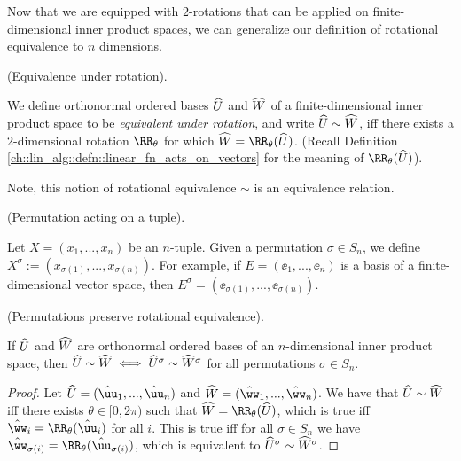 Now that we are equipped with $2$-rotations that can be applied on finite-dimensional inner product spaces, we can generalize our definition of rotational equivalence to $n$ dimensions.

\begin{defn}
    (Equivalence under rotation).
    
    We define orthonormal ordered bases $\widehat{U}$ and $\widehat{W}$ of a finite-dimensional inner product space to be \textit{equivalent under rotation}, and write $\widehat{U} \sim \widehat{W}$, iff there exists a $2$-dimensional rotation $\RR_\theta$ for which $\hW = \RR_\theta(\hU)$. (Recall Definition \ref{ch::lin_alg::defn::linear_fn_acts_on_vectors} for the meaning of $\RR_\theta(\hU)$).
    
    Note, this notion of rotational equivalence $\sim$ is an equivalence relation.
\end{defn}

\begin{defn}
    (Permutation acting on a tuple). 
    
    Let $X = (x_1, ..., x_n)$ be an $n$-tuple. Given a permutation $\sigma \in S_n$, we define $X^\sigma := (x_{\sigma(1)}, ..., x_{\sigma(n)})$. For example, if $E = (\ee_1, ..., \ee_n)$ is a basis of a finite-dimensional vector space, then $E^\sigma = (\ee_{\sigma(1)}, ..., \ee_{\sigma(n)})$.
\end{defn}

\begin{theorem}
    \label{ch::exterior_pwrs::thm::permutations_preserve_rotational_equivalence}

    (Permutations preserve rotational equivalence).
    
    If $\widehat{U}$ and $\widehat{W}$ are orthonormal ordered bases of an $n$-dimensional inner product space, then ${\widehat{U} \sim \widehat{W} \iff \widehat{U}^\sigma \sim \widehat{W}^\sigma}$ for all permutations $\sigma \in S_n$.
\end{theorem}

\begin{proof}
    Let $\hU = (\huu_1, ..., \huu_n)$ and $\hW = (\hww_1, ..., \hww_n)$. We have that $\widehat{U} \sim \widehat{W}$ iff there exists $\theta \in [0, 2\pi)$ such that $\hW = \RR_\theta(\hU)$, which is true iff $\hww_i = \RR_\theta(\huu_i)$ for all $i$. This is true iff for all $\sigma \in S_n$ we have $\hww_{\sigma(i)} = \RR_\theta(\huu_{\sigma(i)})$, which is equivalent to $\widehat{U}^\sigma \sim \widehat{W}^\sigma$.
\end{proof}

